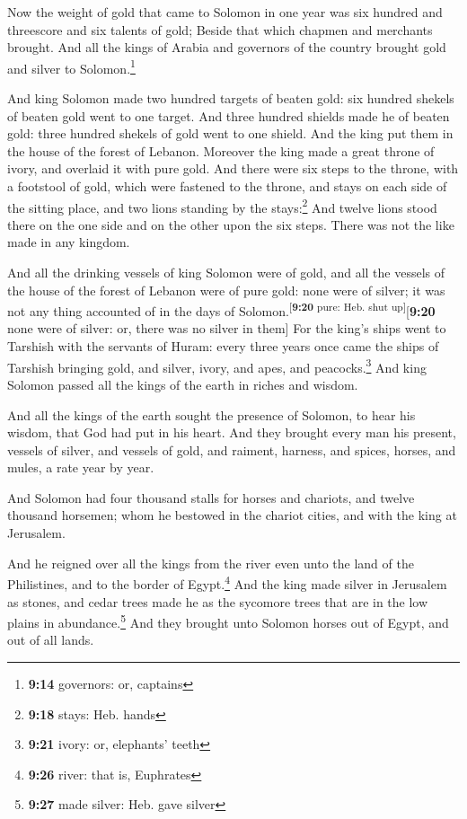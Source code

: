  Now the weight of gold that came to Solomon in one year
was six hundred and threescore and six talents of gold; 
Beside that which chapmen and merchants brought. And all the kings of
Arabia and governors of the country brought gold and silver to
Solomon.\footnote{\textbf{9:14} governors: or, captains}

 And king Solomon made two hundred targets of beaten
gold: six hundred shekels of beaten gold went to one target.
 And three hundred shields made he of beaten gold: three
hundred shekels of gold went to one shield. And the king put them in the
house of the forest of Lebanon.  Moreover the king made a
great throne of ivory, and overlaid it with pure gold. 
And there were six steps to the throne, with a footstool of gold, which
were fastened to the throne, and stays on each side of the sitting
place, and two lions standing by the stays:\footnote{\textbf{9:18}
  stays: Heb. hands}  And twelve lions stood there on the
one side and on the other upon the six steps. There was not the like
made in any kingdom.

 And all the drinking vessels of king Solomon were of
gold, and all the vessels of the house of the forest of Lebanon were of
pure gold: none were of silver; it was not any thing accounted of in the
days of Solomon.\textsuperscript{{[}\textbf{9:20} pure: Heb. shut
up{]}}{[}\textbf{9:20} none were of silver: or, there was no silver in
them{]}  For the king's ships went to Tarshish with the
servants of Huram: every three years once came the ships of Tarshish
bringing gold, and silver, ivory, and apes, and peacocks.\footnote{\textbf{9:21}
  ivory: or, elephants' teeth}  And king Solomon passed
all the kings of the earth in riches and wisdom.

 And all the kings of the earth sought the presence of
Solomon, to hear his wisdom, that God had put in his heart.
 And they brought every man his present, vessels of
silver, and vessels of gold, and raiment, harness, and spices, horses,
and mules, a rate year by year.

 And Solomon had four thousand stalls for horses and
chariots, and twelve thousand horsemen; whom he bestowed in the chariot
cities, and with the king at Jerusalem.

 And he reigned over all the kings from the river even
unto the land of the Philistines, and to the border of Egypt.\footnote{\textbf{9:26}
  river: that is, Euphrates}  And the king made silver in
Jerusalem as stones, and cedar trees made he as the sycomore trees that
are in the low plains in abundance.\footnote{\textbf{9:27} made silver:
  Heb. gave silver}  And they brought unto Solomon horses
out of Egypt, and out of all lands.

